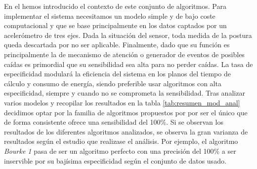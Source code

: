 En el  hemos introducido el contexto de este conjunto de algoritmos. Para implementar el sistema necesitamos un modelo simple y de bajo coste computacional y que se base principalmente en los datos captados por un acelerómetro de tres ejes. Dada la situación del sensor, toda medida de la postura queda descartada por no ser aplicable. Finalmente, dado que su función es principalmente la de mecanismo de atención o generador de eventos de posibles caídas es primordial que su sensibilidad sea alta para no perder caídas. La tasa de especificidad modulará la eficiencia del sistema en los planos del tiempo de cálculo y consumo de energía, siendo preferible usar algoritmos con alta especificidad, siempre y cuando no se comprometa la sensibilidad. Tras analizar varios modelos y recopilar los resultados en la tabla \ref{tab:resumen_mod_anal} decidimos optar por la familia de algoritmos propuestos por \cite{Bourke2006} por ser el único que de forma consistente ofrece una sensibilidad del 100\%. Si se observan los resultados de los diferentes algoritmos analizados, se observa la gran varianza de resultados según el estudio que realizase el análisis. Por ejemplo, el algoritmo \textit{Bourke 1} pasa de ser un algoritmo perfecto con una precisión del 100\% a ser inservible por su bajísima especificidad según el conjunto de datos usado.

